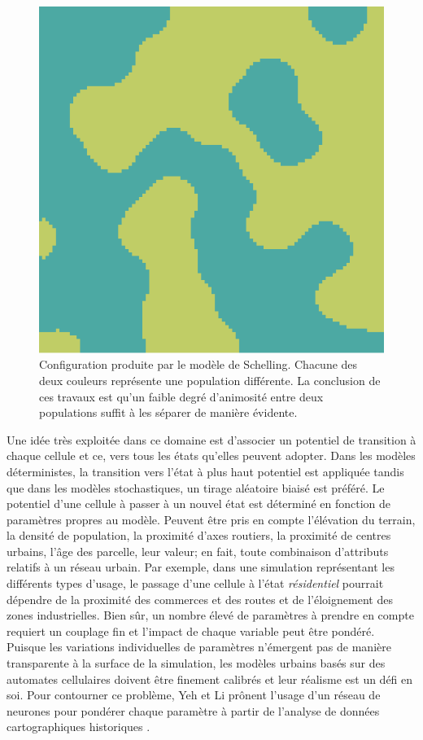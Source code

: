 \documentclass[12pt]{article}
\begin{document}
\begin{figure}[H]
  \centering
  \includegraphics[width=.6\linewidth]{images/schelling.png}
  \caption{Configuration produite par le modèle de Schelling. Chacune
    des deux couleurs représente une population différente. La
    conclusion de ces travaux est qu'un faible degré d'animosité entre
    deux populations suffit à les séparer de manière évidente.}
  \label{fig:schelling}
\end{figure}

Une idée très exploitée dans ce domaine est d'associer un potentiel de
transition à chaque cellule et ce, vers tous les états qu'elles
peuvent adopter. Dans les modèles déterministes, la transition vers
l'état à plus haut potentiel est appliquée tandis que dans les modèles
stochastiques, un tirage aléatoire biaisé est préféré. Le potentiel
d'une cellule à passer à un nouvel état est déterminé en fonction de
paramètres propres au modèle. Peuvent être pris en compte l'élévation
du terrain, la densité de population, la proximité d'axes routiers, la
proximité de centres urbains, l'âge des parcelle, leur valeur; en
fait, toute combinaison d'attributs relatifs à un réseau urbain. Par
exemple, dans une simulation représentant les différents types
d'usage, le passage d'une cellule à l'état \textit{résidentiel}
pourrait dépendre de la proximité des commerces et des routes et de
l'éloignement des zones industrielles. Bien sûr, un nombre élevé de
paramètres à prendre en compte requiert un couplage fin et l'impact de
chaque variable peut être pondéré. Puisque les variations
individuelles de paramètres n'émergent pas de manière transparente à
la surface de la simulation, les modèles urbains basés sur des
automates cellulaires doivent être finement calibrés et leur réalisme
est un défi en soi. Pour contourner ce problème, Yeh et Li prônent
l'usage d'un réseau de neurones pour pondérer chaque paramètre à
partir de l'analyse de données cartographiques historiques
\cite{Yeh2002}.
\end{document}
